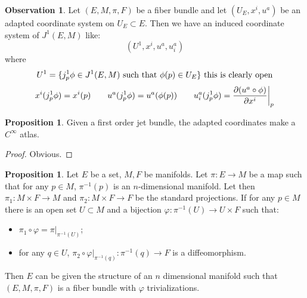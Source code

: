 \documentclass[12pt,a4paper]{report}
\theoremstyle{definition}
\theoremstyle{Theorem}
\newtheorem{Prop}[Def]{Proposition}
\theoremstyle{definition}
\theoremstyle{definition}
\newtheorem{Obs}[Def]{Observation}
\begin{document}
	\begin{Obs}
		Let $(E,M,\pi,F)$ be a fiber bundle and let $(U_E,x^i,u^a)$ be an adapted coordinate system on $U_E\subset E$. Then we have an induced coordinate system of $J^1(E,M)$ like:
		$$(U^1,x^i,u^a,u^a_i)$$
		where
		$$U^1=\{j^1_p\phi\in J^1(E,M)\hbox{ such that }\phi(p)\in U_E\} \hbox{ this is clearly open}$$
		$$x^i(j^1_p\phi)=x^i(p)\hspace{20 pt}u^a(j^1_p\phi)=u^a(\phi(p))\hspace{20 pt}u^a_i(j^1_p\phi)={\partial (u^a\circ \phi)\over \partial x^i}\bigg|_p$$
	\end{Obs}
	\begin{Prop}
		Given a first order jet bundle, the adapted coordinates make a $C^\infty$ atlas.
	\end{Prop}
	\begin{proof}
		Obvious.
	\end{proof}
	\begin{Prop}
		Let $E$ be a set, $M,F$ be manifolds. Let $\pi:E\rightarrow M$ be a map such that for any $p\in M$, $\pi^{-1}(p)$ is an $n$-dimensional manifold. Let then $\pi_1:M\times F\rightarrow M$ and $\pi_2:M\times F\rightarrow F$ be the standard projections. If for any $p\in M$ there is an open set $U\subset M$ and a bijection $\varphi:\pi^{-1}(U)\rightarrow U\times F$ such that:
		\begin{itemize}
			\item $\pi_1\circ \varphi=\pi\big|_{\pi^{-1}(U)}$;
			\item for any $q\in U$, $\pi_2\circ \varphi\big|_{\pi^{-1}(q)}:\pi^{-1}(q)\rightarrow F$ is a diffeomorphism.
		\end{itemize}
		Then $E$ can be given the structure of an $n$ dimensional manifold such that $(E,M,\pi,F)$ is a fiber bundle with $\varphi$ trivializations.
	\end{Prop}
\end{document}
